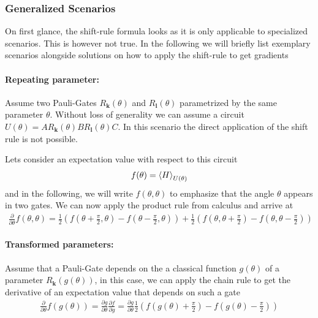 \subsubsection*{Generalized Scenarios}
On first glance, the shift-rule formula looks as it is only applicable to specialized scenarios. This is however not true. In the following we will briefly list exemplary scenarios alongside solutions on how to apply the shift-rule to get gradients
\paragraph{Repeating parameter:} Assume two Pauli-Gates $R_\mathbf{k}(\theta)$ and $R_{\mathbf{l}}(\theta)$  parametrized by the same parameter $\theta$. Without loss of generality we can assume a circuit $U(\theta) = AR_\mathbf{k}(\theta)BR_\mathbf{l}(\theta)C$. In this scenario the direct application of the shift rule is not possible.

Lets consider an expectation value with respect to this circuit
\begin{align}
    f(\theta) = \expval{H}_{U(\theta)}
\end{align}
and in the following, we will write $f(\theta,\theta)$ to emphasize that the angle $\theta$ appears in two gates.
We can now apply the product rule from calculus and arrive at
\begin{align}
    \frac{\partial}{\partial \theta} f(\theta,\theta) = \frac{1}{2}\left(f(\theta+\frac{\pi}{2},\theta) - f(\theta-\frac{\pi}{2},\theta)\right) + \frac{1}{2}\left(f(\theta,\theta+\frac{\pi}{2}) - f(\theta,\theta-\frac{\pi}{2})\right)
\end{align}

\paragraph{Transformed parameters: } Assume that a Pauli-Gate depends on the a classical function $g(\theta)$ of a parameter $R_\mathbf{k}(g(\theta))$, in this case, we can apply the chain rule to get the derivative of an expectation value that depends on such a gate
\begin{align}
    \frac{\partial}{\partial \theta} f(g(\theta)) = \frac{\partial g}{\partial \theta} \frac{\partial f}{\partial g}  = \frac{\partial g}{\partial \theta}\frac{1}{2}\left(f(g(\theta)+\frac{\pi}{2}) - f(g(\theta)-\frac{\pi}{2})\right)
\end{align}

